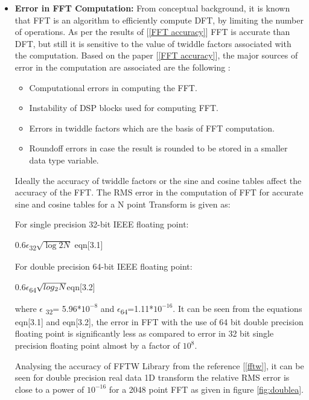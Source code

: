 \begin{itemize}
\item
\textbf{Error in FFT Computation:} From conceptual background, it is known that FFT is an algorithm to efficiently compute DFT, by limiting the number of operations. As per the results of [\ref{FFT accuracy}] FFT is accurate than DFT, but still it is sensitive to the value of twiddle factors associated with the computation. Based on the paper [\ref{FFT accuracy}], the major sources of error in the computation are associated are the following :
\begin{itemize}
\item
Computational errors in computing the FFT.
\item
Instability of DSP blocks used for computing FFT.
\item
Errors in twiddle factors which are the basis of FFT computation.
\item
Roundoff errors in case the result is rounded to be stored in a smaller data type variable.
\end{itemize}
Ideally the accuracy of twiddle factors  or the sine and cosine tables affect the accuracy of the FFT.
The RMS error in the computation of FFT for accurate sine and cosine tables for a N point Transform is given as:

\noindent For single precision 32-bit IEEE floating point: 

\hspace{3cm} 0.6$\epsilon$\textsubscript{32}$\sqrt{\log{2}{N}}$ \hfill eqn[3.1]

\noindent For double precision 64-bit IEEE floating point:

\hspace{3cm}0.6$\epsilon$\textsubscript{64}$\sqrt{log\textsubscript{2}N}$\hfill eqn[3.2]

\noindent where 
\begin{math}
\epsilon
\end{math}
\textsubscript{32}= 5.96*$10^{-8}$ and $\epsilon$\textsubscript{64}=1.11*$10^{-16}$.
\noindent It can be seen from the equations eqn[3.1] and eqn[3.2], the error in FFT with the use of 64 bit double precision floating point is significantly less as compared to error in 32 bit single precision floating point almost by a factor of $10^{8}$. 

Analysing the accuracy of FFTW Library from the reference [\ref{fftw}], it can be seen for double precision real data 1D transform the relative RMS error is close to a power of $10^{-16}$ for a 2048 point FFT as given in figure \ref{fig:doublea}.


\end{itemize}
